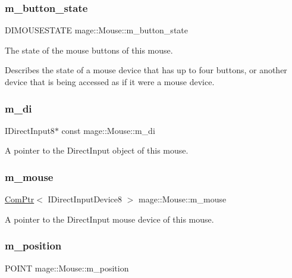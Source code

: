 \subsubsection{\texorpdfstring{m\+\_\+button\+\_\+state}{m\_button\_state}}
{\footnotesize\ttfamily D\+I\+M\+O\+U\+S\+E\+S\+T\+A\+TE mage\+::\+Mouse\+::m\+\_\+button\+\_\+state\hspace{0.3cm}{\ttfamily [private]}}

The state of the mouse buttons of this mouse.

Describes the state of a mouse device that has up to four buttons, or another device that is being accessed as if it were a mouse device. \hypertarget{classmage_1_1_mouse_a892a9e1d5ad16ac9b67a5f69fbfedeab}{}\label{classmage_1_1_mouse_a892a9e1d5ad16ac9b67a5f69fbfedeab} 
\subsubsection{\texorpdfstring{m\+\_\+di}{m\_di}}
{\footnotesize\ttfamily I\+Direct\+Input8$\ast$ const mage\+::\+Mouse\+::m\+\_\+di\hspace{0.3cm}{\ttfamily [private]}}

A pointer to the Direct\+Input object of this mouse. \hypertarget{classmage_1_1_mouse_a3f2803f3c0e008f5d764a11de3dbe098}{}\label{classmage_1_1_mouse_a3f2803f3c0e008f5d764a11de3dbe098} 
\subsubsection{\texorpdfstring{m\+\_\+mouse}{m\_mouse}}
{\footnotesize\ttfamily \hyperlink{namespacemage_ae74f374780900893caa5555d1031fd79}{Com\+Ptr}$<$ I\+Direct\+Input\+Device8 $>$ mage\+::\+Mouse\+::m\+\_\+mouse\hspace{0.3cm}{\ttfamily [private]}}

A pointer to the Direct\+Input mouse device of this mouse. \hypertarget{classmage_1_1_mouse_a690524744270b6ff762f5e8dcc552d28}{}\label{classmage_1_1_mouse_a690524744270b6ff762f5e8dcc552d28} 
\subsubsection{\texorpdfstring{m\+\_\+position}{m\_position}}
{\footnotesize\ttfamily P\+O\+I\+NT mage\+::\+Mouse\+::m\+\_\+position\hspace{0.3cm}{\ttfamily [private]}}

